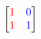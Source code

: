 \documentclass[preview]{standalone}
\begin{document}
\begin{align*}
\begin{bmatrix} {\color{red}1} & {\color{blue}0} \\ {\color{red}1} & {\color{blue}1} \end{bmatrix}
\end{align*}
\end{document}
